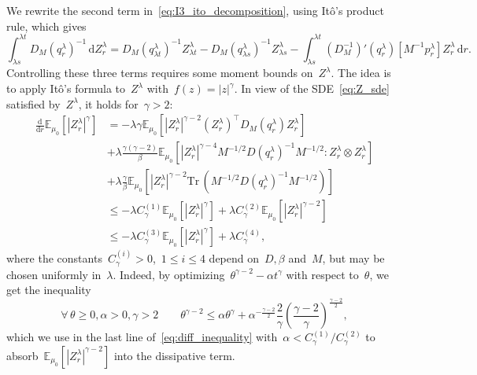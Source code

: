 \documentclass[10pt]{article}
\renewcommand{\d}{\mathrm{d}}
\newcommand{\E}{\mathbb{E}}
\newcommand{\1}{\mathbbm 1}
\begin{document}
We rewrite the second term in~\eqref{eq:I3_ito_decomposition}, using It\^o's product rule, which gives
\begin{equation}
    \label{eq:I3_bv_term_ipp}
    \int_{\lambda s}^{\lambda t}D_M(q_r^\lambda)^{-1}\,\d Z_r^\lambda = D_M(q_{\lambda t}^\lambda)^{-1} Z_{\lambda t}^\lambda - D_M(q_{\lambda s}^\lambda)^{-1}Z_{\lambda s}^\lambda -\int_{\lambda s}^{\lambda t}\left(D_M^{-1}\right)'(q_r^\lambda)[M^{-1}p_r^\lambda]Z_r^\lambda\,\d r.
\end{equation}
Controlling these three terms requires some moment bounds on~$Z^\lambda$. The idea is to apply It\^o's formula to~$Z^\lambda$ with~$f(z)=|z|^\gamma$. In view of the SDE~\eqref{eq:Z_sde} satisfied by~$Z^\lambda$, it holds for~$\gamma>2$:
\begin{equation}
    \label{eq:diff_inequality}
    \begin{aligned}
    \frac{\d}{\d r}\E_{\mu_0}\left[|Z_r^\lambda|^\gamma\right] &= -\lambda\gamma\E_{\mu_0}\left[|Z_r^\lambda|^{\gamma-2}\left(Z_r^{\lambda}\right)^\top D_M(q_r^\lambda)Z_r^{\lambda}\right]\\
    &+\lambda\frac{\gamma(\gamma-2)}{\beta}\E_{\mu_0}\left[|Z_r^\lambda|^{\gamma-4}M^{-1/2}D(q_r^\lambda)^{-1}M^{-1/2}:Z_r^\lambda\otimes Z_r^\lambda\right]\\
    &+\lambda\frac{\gamma}{\beta}\E_{\mu_0}\left[|Z_r^\lambda|^{\gamma-2}\mathrm{Tr}\,\left(M^{-1/2}D(q_r^\lambda)^{-1}M^{-1/2}\right)\right]\\
    &\leq -\lambda C^{(1)}_\gamma\E_{\mu_0}\left[|Z_r^\lambda|^\gamma\right] + \lambda C^{(2)}_\gamma\E_{\mu_0}\left[|Z_r^\lambda|^{\gamma-2}\right]\\
    &\leq -\lambda C^{(3)}_\gamma\E_{\mu_0}\left[|Z_r^\lambda|^\gamma\right] +  \lambda C^{(4)}_\gamma,
    \end{aligned} 
\end{equation}
where the constants~$C_{\gamma}^{(i)} >0$,~$1\leq i\leq 4$ depend on~$D,\beta$ and~$M$, but may be chosen uniformly in~$\lambda$. Indeed, by optimizing~$\theta^{\gamma-2}-\alpha t^{\gamma}$ with respect to~$\theta$, we get the inequality
\begin{equation}
    \forall\,\theta\geq 0,\alpha>0,\gamma>2\qquad \theta^{\gamma-2}\leq \alpha \theta^\gamma +\alpha^{-\frac{\gamma-2}{2}}\frac{2}{\gamma}\left(\frac{\gamma-2}{\gamma}\right)^{\frac{\gamma-2}{2}},
\end{equation}
which we use in the last line of~\eqref{eq:diff_inequality} with~$\alpha<C_\gamma^{(1)}/C_\gamma^{(2)}$ to absorb~$\E_{\mu_0}\left[|Z_r^\lambda|^{\gamma-2}\right]$ into the dissipative term.
\end{document}
